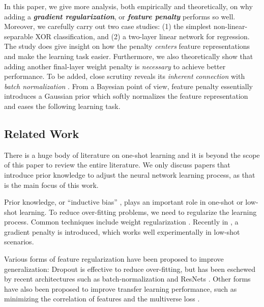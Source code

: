 In this paper, we give more analysis, both empirically and theoretically, on why adding a \textit{\textbf{gradient regularization}}, or \textit{\textbf{feature penalty}} performs so well. Moreover, we carefully carry out two case studies: (1) the simplest non-linear-separable XOR classification, and (2) a two-layer linear network for regression. The study does give insight on how the penalty \textit{centers} feature representations and make the learning task easier. Furthermore, we also theoretically show that adding another final-layer weight penalty is \textit{necessary} to achieve better performance. To be added, close scrutiny reveals its \textit{inherent connection} with \textit{batch normalization} \cite{batch-normalization}. From a Bayesian point of view, feature penalty essentially introduces a Gaussian prior which softly normalizes the feature representation and eases the following learning task.


\subsection{Related Work}
\label{sec:related-work}
There is a huge body of literature on one-shot learning and it is beyond the scope of this paper to review the entire literature. We only discuss papers that introduce prior knowledge to adjust the neural network learning process, as that is the main focus of this work.

Prior knowledge, or ``inductive bias'' \cite{learn-to-learn1}, plays an important role in one-shot or low-shot learning. To reduce over-fitting problems, we need to regularize the learning process. Common techniques include weight regularization \cite{nn-pr}. %
Recently in \cite{low-shot}, a gradient penalty is introduced, which works well experimentally in low-shot scenarios.

Various forms of feature regularization have been proposed to improve generalization: Dropout \cite{dropout} is effective to reduce over-fitting, but has been eschewed by recent architectures such as batch-normalization \cite{batch-normalization} and ResNets \cite{residual_net}. Other forms have also been proposed to improve transfer learning performance, such as minimizing the correlation of features \cite{decorr} and the multiverse loss \cite{multiverse} .

